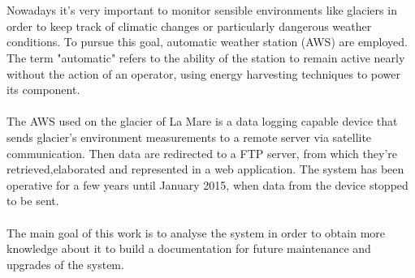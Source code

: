 \section*{}
\paragraph{}
Nowadays it's very important to monitor sensible environments like glaciers in order to keep track of climatic changes or particularly dangerous weather conditions. To pursue this goal, automatic weather station (AWS) are employed. The term "automatic" refers to the ability of the station to remain active nearly without the action of an operator, using energy harvesting techniques to power its component.
\paragraph{}
The AWS used on the glacier of La Mare is a data logging capable device that sends glacier's environment measurements to a remote server via satellite communication. Then data are redirected to a FTP server, from which they're retrieved,elaborated and represented in a web application. The system has been operative for a few years until January 2015, when data from the device stopped to be sent.
\paragraph{}
The main goal of this work is to analyse the system in order to obtain more knowledge about it to build a documentation for future maintenance and upgrades of the system.
\clearpage